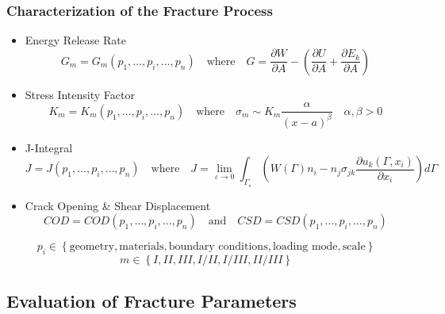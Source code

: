 \documentclass[first,firstsupp,lastsupp,last,hyperref,table]{ETHclass}
\begin{document}
\begin{frame}
\frametitle{\small Characterization of the Fracture Process}
\vspace{-0.25cm}
\centering
\scriptsize
\begin{itemize}[label=]
\item Energy Release Rate
\begin{equation*}
G_{m}=G_{m}\left(p_{1},\dots,p_{i},\dots,p_{n}\right)\quad\text{where}\quad G=\frac{\partial W}{\partial A} - \left(\frac{\partial U}{\partial A}+\frac{\partial E_{k}}{\partial A}\right)
\end{equation*}
\item Stress Intensity Factor
\begin{equation*}
K_{m}=K_{m}\left(p_{1},\dots,p_{i},\dots,p_{n}\right)\quad\text{where}\quad \sigma_{m}\sim K_{m}\frac{\alpha}{\left(x-a\right)^{\beta}}\quad\alpha,\beta>0
\end{equation*}
\item J-Integral
\begin{equation*}
J=J\left(p_{1},\dots,p_{i},\dots,p_{n}\right)\quad\text{where}\quad J=\lim_{\varepsilon\to 0}\int_{\Gamma_{\varepsilon}}\left(W\left(\Gamma\right)n_{i}-n_{j}\sigma_{jk}\frac{\partial u_{k}\left(\Gamma,x_{i}\right)}{\partial x_{i}}\right)d\Gamma
\end{equation*}
\item Crack Opening \& Shear Displacement
\begin{equation*}
COD=COD\left(p_{1},\dots,p_{i},\dots,p_{n}\right)\quad\text{and}\quad CSD=CSD\left(p_{1},\dots,p_{i},\dots,p_{n}\right)
\end{equation*}
\end{itemize}
\vspace{5pt}
\begin{equation*}
p_{i}\in\left\{\text{geometry},\text{materials},\text{boundary conditions},\text{loading mode},\text{scale}\right\}
\end{equation*}
\begin{equation*}
m\in\left\{I,II,III,I/II,I/III,II/III\right\}
\end{equation*}
\end{frame}

\subsection[Evaluation  of Fracture Parameters]{Evaluation of Fracture Parameters}
\end{document}
